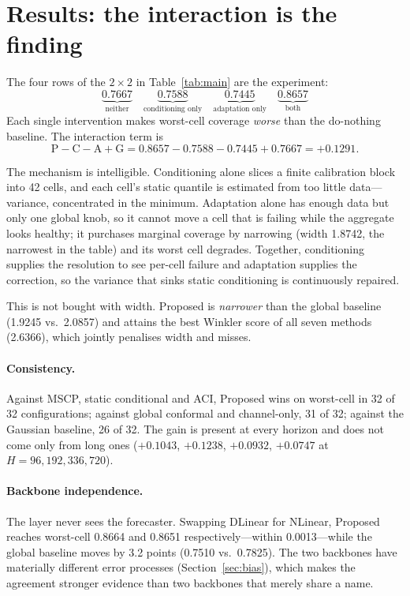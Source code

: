 \documentclass[11pt]{article}
\begin{document}
\section{Results: the interaction is the finding}\label{sec:results}

The four rows of the $2\times2$ in Table~\ref{tab:main} are the experiment:
\[
\underbrace{0.7667}_{\text{neither}} \quad
\underbrace{0.7588}_{\text{conditioning only}} \quad
\underbrace{0.7445}_{\text{adaptation only}} \quad
\underbrace{0.8657}_{\text{both}}
\]
Each single intervention makes worst-cell coverage \emph{worse} than the do-nothing baseline. The interaction term is
\[
\text{P} - \text{C} - \text{A} + \text{G} = 0.8657 - 0.7588 - 0.7445 + 0.7667 = +0.1291 .
\]

The mechanism is intelligible. Conditioning alone slices a finite calibration block into 42 cells, and each cell's static quantile is estimated from too little data---variance, concentrated in the minimum. Adaptation alone has enough data but only one global knob, so it cannot move a cell that is failing while the aggregate looks healthy; it purchases marginal coverage by narrowing (width 1.8742, the narrowest in the table) and its worst cell degrades. Together, conditioning supplies the resolution to see per-cell failure and adaptation supplies the correction, so the variance that sinks static conditioning is continuously repaired.

This is not bought with width. Proposed is \emph{narrower} than the global baseline (1.9245 vs.\ 2.0857) and attains the best Winkler score of all seven methods (2.6366), which jointly penalises width and misses.

\paragraph{Consistency.} Against MSCP, static conditional and ACI, Proposed wins on worst-cell in 32 of 32 configurations; against global conformal and channel-only, 31 of 32; against the Gaussian baseline, 26 of 32. The gain is present at every horizon and does not come only from long ones ($+0.1043$, $+0.1238$, $+0.0932$, $+0.0747$ at $H = 96, 192, 336, 720$).

\paragraph{Backbone independence.} The layer never sees the forecaster. Swapping DLinear for NLinear, Proposed reaches worst-cell 0.8664 and 0.8651 respectively---within 0.0013---while the global baseline moves by 3.2 points (0.7510 vs.\ 0.7825). The two backbones have materially different error processes (Section~\ref{sec:bias}), which makes the agreement stronger evidence than two backbones that merely share a name.
\end{document}
